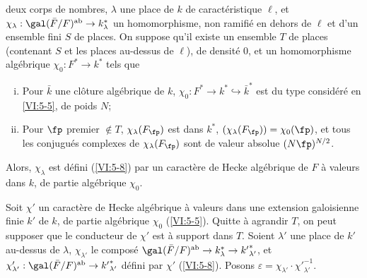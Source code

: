 \begin{theorem_}\label{VI:5-10}
 deux corps de nombres, $\lambda$ une place de $k$ de 
caractéristique $\ell$, et 
$\chi_\lambda:\gal(\bar F/F)^\textnormal{ab}\to k_\lambda^\ast$ un 
homomorphisme, non ramifié en dehors de $\ell$ et d'un ensemble fini $S$ de 
places. On suppose qu'il existe un ensemble $T$ de places (contenant $S$ et les 
places au-dessus de $\ell$), de densité $0$, et un homomorphisme algébrique 
$\chi_0:F^\ast \to k^\ast$ tels que 
\begin{enumerate}[(i)]
  \item Pour $\bar k$ une clôture algébrique de $k$, 
    $\chi_0:F^\ast \to k^\ast \hookrightarrow \bar k^\ast$ est du type 
    considéré en \ref{VI:5-5}, de poids $N$; 
  
\item {}Pour $\fp$ premier $\notin T$, $\chi_\lambda(F_\fp)$ est dans 
    $k^\ast$, $(\chi_\lambda(F_\fp))=\chi_0(\fp)$, et tous les conjugués 
    complexes de $\chi_\lambda(F_\fp)$ sont de valeur absolue $(N \fp)^{N/2}$. 
\end{enumerate}

Alors, $\chi_\lambda$ est défini (\ref{VI:5-8}) par un caractère de Hecke 
algébrique de $F$ à valeurs dans $k$, de partie algébrique $\chi_0$. 
\end{theorem_}

Soit $\chi'$ un caractère de Hecke algébrique à valeurs dans une 
extension galoisienne finie $k'$ de $k$, de partie algébrique $\chi_0$ 
(\ref{VI:5-5}). Quitte à agrandir $T$, on peut supposer que le conducteur de 
$\chi'$ est à support dans $T$. Soient $\lambda'$ une place de $k'$ au-dessus 
de $\lambda$, $\chi_{\lambda'}$ le composé 
$\gal(\bar F/F)^\text{ab}\to k_\lambda^\ast \to {k'}_{\lambda'}^\ast$, et 
$\chi_{\lambda'}':\gal(\bar F/F)^\text{ab}\to {k'}_{\lambda'}^\ast$ défini 
par $\chi'$ (\ref{VI:5-8}). Posons 
$\varepsilon = \chi_{\lambda'} \cdot {\chi'}_{\lambda'}^{-1}$. 

